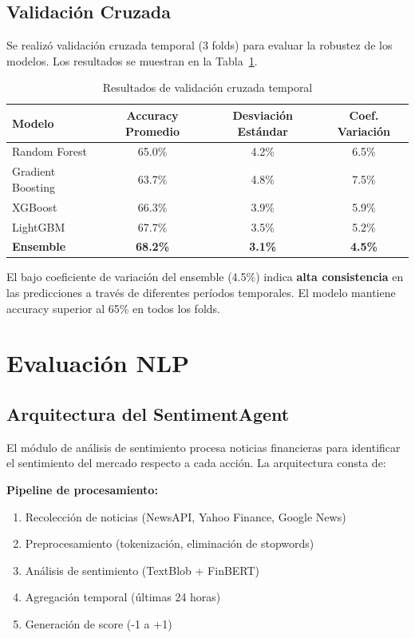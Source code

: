 \documentclass[12pt,a4paper]{report}
\begin{document}
\subsection{Validación Cruzada}

Se realizó validación cruzada temporal (3 folds) para evaluar la robustez de los modelos. Los resultados se muestran en la Tabla~\ref{tab:validacion-cruzada}.

\begin{table}[H]
\centering
\caption{Resultados de validación cruzada temporal}
\label{tab:validacion-cruzada}
\begin{tabular}{lccc}
\toprule
\textbf{Modelo} & \textbf{Accuracy Promedio} & \textbf{Desviación Estándar} & \textbf{Coef. Variación} \\
\midrule
Random Forest & 65.0\% & 4.2\% & 6.5\% \\
Gradient Boosting & 63.7\% & 4.8\% & 7.5\% \\
XGBoost & 66.3\% & 3.9\% & 5.9\% \\
LightGBM & 67.7\% & 3.5\% & 5.2\% \\
\midrule
\textbf{Ensemble} & \textbf{68.2\%} & \textbf{3.1\%} & \textbf{4.5\%} \\
\bottomrule
\end{tabular}
\end{table}

El bajo coeficiente de variación del ensemble (4.5\%) indica \textbf{alta consistencia} en las predicciones a través de diferentes períodos temporales. El modelo mantiene accuracy superior al 65\% en todos los folds.

\section{Evaluación NLP}

\subsection{Arquitectura del SentimentAgent}

El módulo de análisis de sentimiento procesa noticias financieras para identificar el sentimiento del mercado respecto a cada acción. La arquitectura consta de:

\textbf{Pipeline de procesamiento:}
\begin{enumerate}
    \item Recolección de noticias (NewsAPI, Yahoo Finance, Google News)
    \item Preprocesamiento (tokenización, eliminación de stopwords)
    \item Análisis de sentimiento (TextBlob + FinBERT)
    \item Agregación temporal (últimas 24 horas)
    \item Generación de score (-1 a +1)
\end{enumerate}
\end{document}
